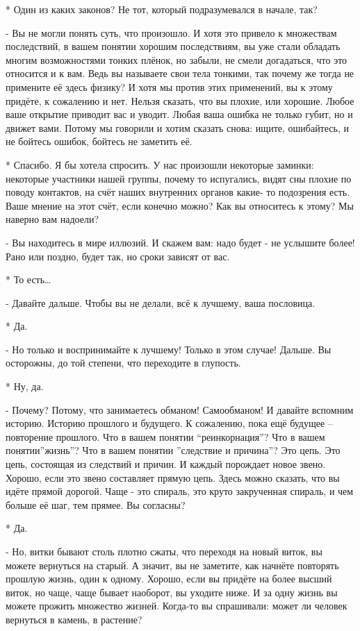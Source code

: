 *  Один из каких законов?  Не тот, который подразумевался в начале, так?

- Вы не могли понять суть, что произошло. И хотя это привело к множествам последствий, в вашем понятии хорошим последствиям, вы уже стали обладать многим возможностями тонких плёнок, но забыли, не смели догадаться, что это относится и к вам. Ведь вы называете свои тела тонкими, так почему же тогда  не примените её здесь физику? И хотя мы против этих применений, вы к этому придёте, к сожалению и нет. Нельзя сказать, что вы плохие, или хорошие. Любое ваше открытие приводит вас и уводит. Любая ваша ошибка не только губит, но и движет вами. Потому мы говорили и хотим сказать снова: ищите, ошибайтесь, и не бойтесь ошибок, бойтесь не заметить её.

* Спасибо. Я бы хотела спросить. У нас произошли некоторые заминки: некоторые участники нашей группы, почему то испугались, видят сны плохие по поводу контактов, на счёт наших внутренних органов какие- то подозрения есть. Ваше мнение на этот счёт, если конечно можно? Как вы относитесь к этому? Мы наверно вам надоели?

- Вы находитесь в мире иллюзий. И скажем вам: надо будет - не услышите более! Рано или поздно, будет так, но сроки зависят от вас.

* То есть…

 - Давайте дальше. Чтобы вы не делали, всё к лучшему, ваша пословица.

* Да.

- Но только и воспринимайте к лучшему! Только в этом случае! Дальше. Вы осторожны, до той степени, что переходите в глупость.

* Ну, да. 

- Почему? Потому, что занимаетесь обманом! Самообманом! И давайте вспомним историю. Историю прошлого и будущего. К сожалению, пока ещё будущее – повторение прошлого. Что в вашем понятии “реинкорнация”? Что в вашем понятии”жизнь”? Что в вашем понятии ”следствие и причина”? Это цепь. Это цепь, состоящая из следствий и причин. И каждый порождает новое звено.  Хорошо, если это звено составляет прямую цепь. Здесь можно сказать, что вы идёте прямой дорогой. Чаще - это спираль, это круто закрученная спираль, и чем больше её шаг, тем прямее. Вы согласны?

* Да.

- Но, витки бывают столь плотно сжаты, что переходя на новый виток, вы можете вернуться на старый. А значит, вы не заметите, как начнёте повторять прошлую жизнь, один к одному. Хорошо, если вы придёте на более высший виток, но чаще, чаще бывает наоборот, вы уходите ниже. И за одну жизнь вы можете прожить множество жизней. Когда-то вы спрашивали: может ли человек вернуться в камень, в растение?

